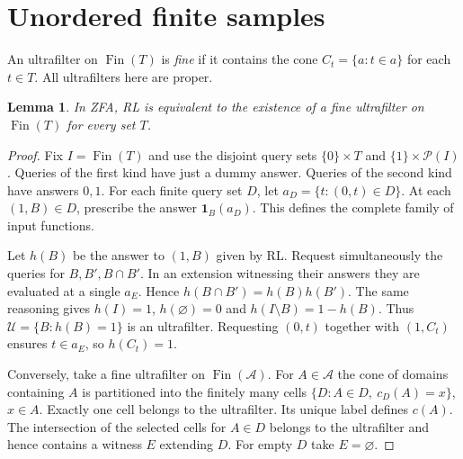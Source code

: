 \documentclass[11pt]{article}
\newtheorem{lemma}[theorem]{Lemma}
\newcommand{\Fin}{\operatorname{Fin}}
\newcommand{\UU}{\mathcal U}
\begin{document}
\section{Unordered finite samples}
An ultrafilter on $\Fin(T)$ is \emph{fine} if it contains the cone $C_t=\{a:t\in a\}$ for each $t\in T$. All ultrafilters here are proper.
\begin{lemma}\label{fine}
In ZFA, RL is equivalent to the existence of a fine ultrafilter on $\Fin(T)$ for every set $T$.
\end{lemma}
\begin{proof}
Fix $I=\Fin(T)$ and use the disjoint query sets $\{0\}\times T$ and $\{1\}\times\mathcal P(I)$. Queries of the first kind have just a dummy answer. Queries of the second kind have answers $0,1$. For each finite query set $D$, let $a_D=\{t:(0,t)\in D\}$. At each $(1,B)\in D$, prescribe the answer $\mathbf1_B(a_D)$. This defines the complete family of input functions.

Let $h(B)$ be the answer to $(1,B)$ given by RL. Request simultaneously the queries for $B,B',B\cap B'$. In an extension witnessing their answers they are evaluated at a single $a_E$. Hence $h(B\cap B')=h(B)h(B')$. The same reasoning gives $h(I)=1$, $h(\varnothing)=0$ and $h(I\setminus B)=1-h(B)$. Thus $\UU=\{B:h(B)=1\}$ is an ultrafilter. Requesting $(0,t)$ together with $(1,C_t)$ ensures $t\in a_E$, so $h(C_t)=1$.

Conversely, take a fine ultrafilter on $\Fin(\mathcal A)$. For $A\in\mathcal A$ the cone of domains containing $A$ is partitioned into the finitely many cells $\{D:A\in D,\ c_D(A)=x\}$, $x\in A$. Exactly one cell belongs to the ultrafilter. Its unique label defines $c(A)$. The intersection of the selected cells for $A\in D$ belongs to the ultrafilter and hence contains a witness $E$ extending $D$. For empty $D$ take $E=\varnothing$.
\end{proof}
\end{document}
